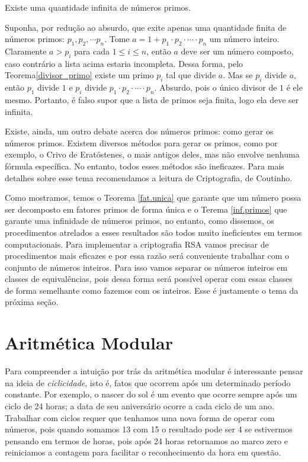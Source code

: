 \begin{Th}\label{inf.primos}
Existe uma quantidade infinita de n\'umeros primos.
\end{Th}

\newline
Suponha, por redu\c{c}\~ao ao absurdo, que exite apenas uma quantidade finita de n\'umeros primos: $p_1, p_2,\cdots p_n$. Tome $a=1+p_1\cdot p_2\cdot \cdots \cdot p_n$ um n\'umero inteiro. Claramente $a>p_i$ para cada $1\leq i\leq n$, ent\~ao $a$ deve ser um n\'umero composto, caso contr\'ario a 
lista acima estaria incompleta. Dessa forma, pelo Teorema\ref{divisor_primo} existe um primo $p_i$ tal que divide $a$. Mas se $p_i$ divide $a$, ent\~ao $p_1$ divide $1$ e $p_i$ divide $p_1\cdot p_2\cdot \cdots \cdot p_n$. Absurdo, pois o \'unico divisor de $1$ \'e ele mesmo. Portanto, \'e falso supor que a lista de primos seja finita, logo ela deve ser infinita.
\hfill\newline

Existe, ainda, um outro debate acerca dos n\'umeros primos: como gerar os n\'umeros primos. Existem diversos m\'etodos para gerar os primos, como por exemplo, o Crivo de Erat\'ostenes, o mais antigos deles, mas n\~ao envolve nenhuma f\'ormula espec\'ifica. No entanto, todos esses m\'etodos s\~ao ineficazes. Para mais detalhes sobre esse tema recomendamos a leitura de Criptografia, de Coutinho\cite{coutinho}.

Como mostramos, temos o Teorema \ref{fat.unica} que garante que um n\'umero possa ser decomposto
em fatores primos de forma \'unica e o Terema \ref{inf.primos} que garante uma infinidade de n\'umeros primos, no entanto, como dissemos, os procedimentos atrelados a esses resultados s\~ao todos muito ineficientes em termos computacionais. Para implementar a criptografia RSA vamos precisar de procedimentos mais eficazes e por essa raz\~ao ser\'a conveniente trabalhar com o conjunto de n\'umeros inteiros. Para isso vamos separar os n\'umeros inteiros em classes de equival\^encias, pois dessa forma ser\'a poss\'ivel operar com essas classes de forma semelhante como fazemos com os inteiros. Esse \'e justamente o tema da pr\'oxima se\c{c}\~ao.  


\section{Aritm\'etica Modular}

\hspace{7mm}Para compreender a intui\c{c}\~ao por tr\'as da aritm\'etica modular \'e interessante pensar na ideia de \textit{ciclicidade}, isto \'e, fatos que ocorrem ap\'os um determinado per\'iodo constante. Por exemplo, o nascer do sol \'e um evento que ocorre sempre ap\'os um ciclo de 24 horas; a data de seu anivers\'ario ocorre a cada ciclo de um ano. Trabalhar com ciclos requer que tenhamos uma nova forma de operar com n\'umeros, pois quando somamos 13 com 15 o resultado pode ser 4 se estivermos pensando em termos de horas, pois ap\'os 24 horas retornamos ao marco zero e reiniciamos a contagem para facilitar o reconhecimento da hora em quest\~ao. 

